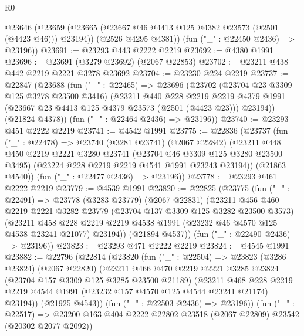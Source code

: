 \begin{lexlean}{R0}
\begin{coremodule}
      @23646
        (@23659 (@23665 (@23667 @46 @4413 @125 @4382 @23573 (@2501 (@4423 @46))) @23194))
        (@2526 @4295 @4381))
      (fun ("_" : @22450 @2436) => @23196))
@23691 := @23293 @443 @2222 @2219
@23692 := @4380 @1991
@23696 := @23691 (@3279 @23692) (@2067 @22853)
@23702 := @23211 @438 @442 @2219 @2221 @3278 @23692
@23704 := @23230 @224 @2219
@23737 := @22847
    (@23688
      (fun ("_" : @22465) =>
      @23696
        (@23702
          (@23704 @23 @3309 @125 @3278 @23500 @3416)
          (@23211
            @440
            @228
            @2219
            @2219
            @4379
            @1991
            (@23667 @23 @4413 @125 @4379 @23573 (@2501 (@4423 @23)))
            @23194))
        (@21824 @4378))
      (fun ("_" : @22464 @2436) => @23196))
@23740 := @23293 @451 @2222 @2219
@23741 := @4542 @1991
@23775 := @22836
    (@23737
      (fun ("_" : @22478) =>
      @23740
        (@3281 @23741)
        (@2067 @22842)
        (@23211
          @448
          @450
          @2219
          @2221
          @3280
          @23741
          (@23704 @46 @3309 @125 @3280 @23500 @3495)
          (@23224 @228 @2219 @2219 @4541 @1991 @23243 @23194))
        (@21863 @4540))
      (fun ("_" : @22477 @2436) => @23196))
@23778 := @23293 @461 @2222 @2219
@23779 := @4539 @1991
@23820 := @22825
    (@23775
      (fun ("_" : @22491) =>
      @23778
        (@3283 @23779)
        (@2067 @22831)
        (@23211
          @456
          @460
          @2219
          @2221
          @3282
          @23779
          (@23704 @137 @3309 @125 @3282 @23500 @3573)
          (@23211
            @458
            @228
            @2219
            @2219
            @4538
            @1991
            (@23232 @46 @4570 @125 @4538 @23241 @21077)
            @23194))
        (@21894 @4537))
      (fun ("_" : @22490 @2436) => @23196))
@23823 := @23293 @471 @2222 @2219
@23824 := @4545 @1991
@23882 := @22796
    (@22814
      (@23820
        (fun ("_" : @22504) =>
        @23823
          (@3286 @23824)
          (@2067 @22820)
          (@23211
            @466
            @470
            @2219
            @2221
            @3285
            @23824
            (@23704 @157 @3309 @125 @3285 @23500 @21189)
            (@23211
              @468
              @228
              @2219
              @2219
              @4544
              @1991
              (@23232 @157 @4570 @125 @4544 @23241 @21174)
              @23194))
          (@21925 @4543))
        (fun ("_" : @22503 @2436) => @23196))
      (fun ("_" : @22517) =>
      @23200 @163 @404 @2222 @22802 @23518 (@2067 @22809) @23542 (@20302 @2077 @2092))

\end{coremodule}
\end{lexlean}
